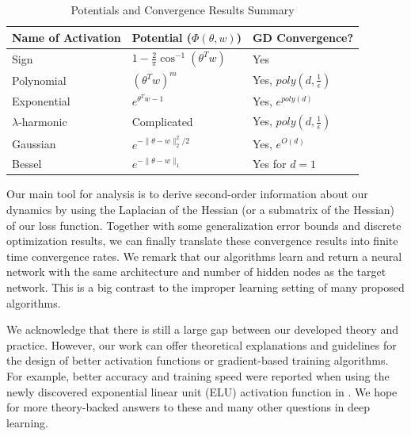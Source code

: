 \documentclass{article}
\begin{document}
\begin{table}[tb]
\caption{Potentials and Convergence Results Summary}
\label{table1}
\noindent
\vskip 0.1in
\begin{center}
\begin{small}
\begin{sc}
\begin{tabular}{
  |p{}%
  |p{}%
  |p{}|%
  }
   \hline 
        Name of Activation&  Potential  ($\Phi(\theta,w)$)    & GD Convergence? \\ \hline 
        Sign & $1 - \frac{2}{\pi}\cos^{-1}(\theta^Tw)$       & Yes \\ 
        Polynomial  & $(\theta^Tw)^m$       & Yes, $poly(d,\frac{1}{\epsilon})$  \\        
        Exponential       & $e^{\theta^Tw-1}$       & Yes, $e^{poly(d)}$  \\ 
        $\lambda$-harmonic  & Complicated  & Yes, $poly(d,\frac{1}{\epsilon})$ \\
        Gaussian  &  $e^{-\|\theta-w\|_2^2/2}$       & Yes, $e^{O(d)}$ \\
        Bessel    &  $e^{-\|\theta-w\|_1}$        & Yes for $d=1$  \\   
        \hline
\end{tabular}
\end{sc}
\end{small}
\end{center}
\vskip -0.1in
\end{table} 



Our main tool for analysis is to derive second-order information about our dynamics by using the Laplacian of the Hessian (or a submatrix of the Hessian) of our loss function. Together with some generalization error bounds and discrete optimization results, we can finally translate these convergence results into finite time convergence rates. We remark that our algorithms learn and return a neural network with the same architecture and number of hidden nodes as the target network. This is a big contrast to the improper learning setting of many proposed algorithms. 

We acknowledge that there is still a large gap between our developed theory and practice. However, our work can offer theoretical explanations and guidelines for the design of better activation functions or gradient-based training algorithms. For example, better accuracy and training speed were reported when using the newly discovered exponential linear unit (ELU) activation function in \cite{ClevertUH15} \cite{ShahKSS16}. We hope for more theory-backed answers to these and many other questions in deep learning.
\end{document}
